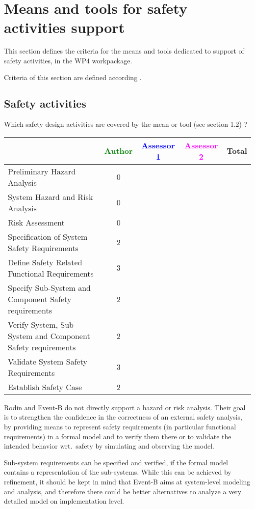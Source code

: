 \section{Means and tools for safety activities support}
\label{sec:safety}


This section defines the criteria for the means and tools dedicated to support of safety activities, in the WP4 workpackage.

Criteria of this section are defined according \citep{D4.2.a}.

\subsection{Safety activities}

Which safety design activities are covered by the mean or tool (see \citep{D4.2.a} section 1.2) ?

\begin{tabular}{|l | c | c | c | c|}
\hline
& \textcolor{green}{Author} & \textcolor{blue}{Assessor 1} & \textcolor{magenta}{Assessor 2} & Total \\
\hline
Preliminary Hazard Analysis & 0 & & &  \\
\hline
System Hazard and Risk Analysis & 0 & & & \\
\hline
Risk Assessment & 0 & & & \\
\hline
Specification of System Safety Requirements & 2 & & &  \\
\hline
Define Safety Related Functional Requirements & 3 & & & \\
\hline
Specify Sub-System and Component
Safety requirements & 2 & & & \\
\hline
Verify System, Sub-System and Component
Safety requirements & 2 & & &  \\
\hline
Validate System Safety Requirements & 3 & & & \\
\hline
Establish Safety Case & 2 & & & \\
\hline
\end{tabular}

\begin{author_comment}
  Rodin and Event-B do not directly support a hazard or risk analysis. Their
  goal is to strengthen the confidence in the correctness of an external safety
  analysis, by providing means to represent safety requirements (in particular
  functional requirements) in a formal model and to verify them there or to
  validate the intended behavior wrt.\ safety by simulating and observing the
  model.

  Sub-system requirements can be specified and verified, if the formal model
  contains a representation of the sub-systems. While this can be achieved by
  refinement, it should be kept in mind that Event-B aims at system-level
  modeling and analysis, and therefore there could be better alternatives to
  analyze a very detailed model on implementation level.
\end{author_comment}

